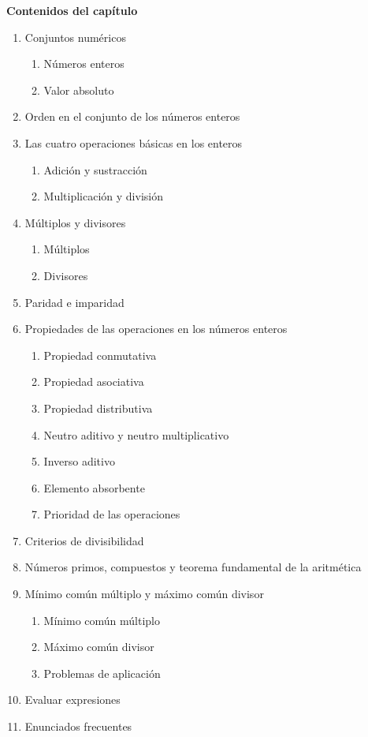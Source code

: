 \documentclass[11pt,letterpaper]{article}
\begin{document}
\begin{tcolorbox}[theorybox]
\textbf{Contenidos del capítulo}
\begin{enumerate}
  \item Conjuntos numéricos
  \begin{enumerate}[label=\alph*.]
    \item Números enteros
    \item Valor absoluto
  \end{enumerate}
  \item Orden en el conjunto de los números enteros
  \item Las cuatro operaciones básicas en los enteros
  \begin{enumerate}[label=\alph*.]
    \item Adición y sustracción
    \item Multiplicación y división
  \end{enumerate}
  \item Múltiplos y divisores
  \begin{enumerate}[label=\alph*.]
    \item Múltiplos
    \item Divisores
  \end{enumerate}
  \item Paridad e imparidad
  \item Propiedades de las operaciones en los números enteros
  \begin{enumerate}[label=\alph*.]
    \item Propiedad conmutativa
    \item Propiedad asociativa
    \item Propiedad distributiva
    \item Neutro aditivo y neutro multiplicativo
    \item Inverso aditivo
    \item Elemento absorbente
    \item Prioridad de las operaciones
  \end{enumerate}
  \item Criterios de divisibilidad
  \item Números primos, compuestos y teorema fundamental de la aritmética
  \item Mínimo común múltiplo y máximo común divisor
  \begin{enumerate}[label=\alph*.]
    \item Mínimo común múltiplo
    \item Máximo común divisor
    \item Problemas de aplicación
  \end{enumerate}
  \item Evaluar expresiones
  \item Enunciados frecuentes
\end{enumerate}
\end{tcolorbox}
\end{document}
